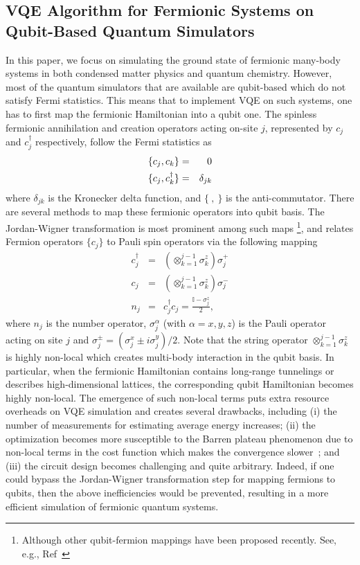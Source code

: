 \documentclass[aps, prx, reprint, superscriptaddress]{revtex4-2}
\begin{document}
\subsection{VQE Algorithm for Fermionic Systems on Qubit-Based Quantum Simulators }
\label{sec:VQE_Qubit_Simulator}

In this paper, we focus on simulating the ground state of fermionic many-body systems in both condensed matter physics and quantum chemistry. However, most of the quantum simulators that are available are qubit-based which do not satisfy Fermi statistics. This means that to implement VQE on such systems, one has to first map the fermionic Hamiltonian into a qubit one. The spinless fermionic annihilation and creation operators acting on-site $j$, represented by $c_j$ and $c_j^\dagger$ respectively, follow the Fermi statistics as 
\begin{eqnarray}
    \{c_j,c_k\}&=&0 \cr
    \{c_j,c_k^\dagger\}&=&\delta_{jk}
\end{eqnarray}
where $\delta_{jk}$ is the Kronecker delta function, and $\lbrace ~,~ \rbrace $ is the anti-commutator. There are several methods to map these fermionic operators into qubit basis. The Jordan-Wigner transformation is most prominent among such maps \footnote{Although other qubit-fermion mappings have been proposed recently. See, e.g., Ref~\cite{Steudtner2018fermion} }, and relates Fermion operators $\lbrace c_{j}\rbrace$ to Pauli spin operators via the following mapping
\begin{eqnarray}
    c_{j}^{\dagger} & = &\left(\otimes_{k=1}^{j-1}\sigma_k^z\right) \sigma_{j}^{+} \\
    c_{j} & = &\left(\otimes_{k=1}^{j-1}\sigma_k^z \right) \sigma_{j}^{-} \\
    n_j&=&c_{j}^{\dagger}c_{j} = \frac{\mathbb{I}-\sigma_{j}^{z}}{2},
\end{eqnarray}
where $n_j$ is the number operator, $\sigma^\alpha_j$ (with $\alpha{=}x,y,z$) is the Pauli operator acting on site 
$j$ and $\sigma^\pm_j{=}(\sigma^x_j\pm i\sigma^y_j)/2$. Note that the string operator $\otimes_{k{=}1}^{j-1}\sigma_k^z$ is highly non-local which creates multi-body interaction in the qubit basis. In particular, when the fermionic Hamiltonian contains long-range tunnelings or describes high-dimensional lattices, the corresponding qubit Hamiltonian becomes highly non-local. The emergence of such non-local terms puts extra resource overheads on VQE simulation and creates several drawbacks, including (i) the number of measurements for estimating average energy increases; (ii) the optimization becomes more susceptible to the Barren plateau phenomenon due to non-local terms in the cost function which makes the convergence slower~\cite{mcclean2018barren,cerezo2021cost}; and (iii) the circuit design becomes challenging and quite arbitrary. Indeed, if one could bypass the Jordan-Wigner transformation step for mapping fermions to qubits, then the above inefficiencies would be prevented, resulting in a more efficient simulation of fermionic quantum systems. 
\end{document}

